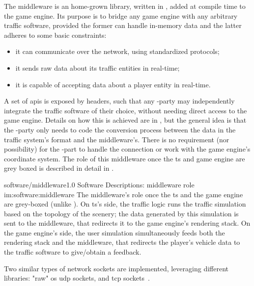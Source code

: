 The middleware is an home-grown library, written in , added at compile time to the game engine. Its purpose is to bridge any game engine with any arbitrary traffic software, provided the former can handle in-memory data and the latter adheres to some basic constraints:

\begin{itemize}
	\item it can communicate over the network, using standardized protocols;
	\item it sends raw data about its traffic entities in real-time;
	\item it is capable of accepting data about a player entity in real-time.
\end{itemize}

A set of \glspl{api} is exposed by  headers, such that any -party may independently integrate the traffic software of their choice, without needing direct access to the game engine. Details on how this is achieved are in , but the general idea is that the -party only needs to code the conversion process between the data in the traffic system's format and the \gls{middleware}'s. There is no requirement (nor possibility) for the -part to handle the connection or work with the game engine's coordinate system. The role of this \gls{middleware} once the \gls{ts} and game engine are grey boxed is described in detail in .

\begin{image}
	{software/middleware}{1.0}
	{Software Descriptions: \gls{middleware} role}
	{im:software:middleware}
	{}
	{The \gls{middleware}'s role once the \gls{ts} and the game engine are grey-boxed (unlike ). On \gls{ts}'s side, the traffic logic runs the traffic simulation based on the topology of the scenery; the data generated by this simulation is sent to the \gls{middleware}, that redirects it to the game engine's rendering stack. On the game engine's side, the user simulation simultaneously feeds both the rendering stack and the middleware, that redirects the player's vehicle data to the traffic software to give/obtain a feedback.}
\end{image}

Two similar types of network sockets are implemented, leveraging different libraries: "raw" \gls{os} \gls{udp} sockets, and  \gls{tcp} sockets~\cite{software:zmq}.

